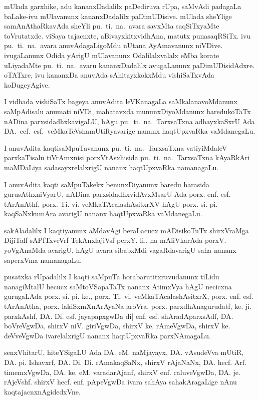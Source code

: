 mUlada garxhike, adu kananxDadalilx paDediruva rUpa, saMvAdi padagaLa baLake-ivu mUlavanunx kananxDadalilx paDimUDisive. mUlada sheYlige samAnAthaRkavAda sheYli pu.~ti.~na.~avara savxMta saqSiTxyaMte toVrutatxde. viSaya tajacnxte, aBivayxkitxvidhAna, matutx punasaqRSiTx. ivu pu.~ti.~na.~avara anuvAdagaLigoMdu nUtana AyAmavanunx niVDive. ivugaLanunx Odida yArigU mUlavanunx Odalilalxvalalx eMba korate uLiyadaMte pu.~ti.~na.~avaru kananxDadalilx avugaLanunx paDimUDisidAdxre. oTATxre, ivu kananxDa anuvAda sAhitayxkokxMdu vishiSaTxvAda koDugeyAgive.

I vidhada vishiSaTx bageya anuvAdita leVKanagaLa saMkalanavoMdanunx saMpAdi\-salu anumati niVDi, mahatavxda mununxDiyoMdanunx baredukoTaTx nADina parxsidadhx\-kavi\-gaLU, hAgu pu.~ti.~na.~TarxsaTxna adhayxkaSxrU Ada DA.~ecf.~esf.~veMkaTeVshamUtiR\-yavarige nananx haqtUpxvaRka vaMdanegaLu.

I anuvAdita kaqtisaMpuTavanunx pu.~ti.~na.~TarxsaTxna vatiyiMdaleV parxkaTisalu tiVrAmxnisi porxVtAsxhisida pu.~ti.~na.~TarxsaTxna kAyaRkAri maMDaLiya sadasayxrelalxrigU nananx haqtUpxvaRka namanagaLu. 

I anuvAdita kaqti saMpuTakekx benunxDiyanunx baredu  harasida gurusAthxniVyarU, nADina parxsidadhxvidAvxMsarU Ada porx. enf. esf. tArAnAthf. porx. Ti. vi. veMkaTAcalashAsitxrXV hAgU porx. si. pi. kaqSaNxkumAra avarigU nananx haqtUpxvaRka vaMdanegaLu.

 sakAladalilx I kaqtiyanunx aMdavAgi beraLacucx mADisikoTuTx shirxVraMga DijiTalf sAPfTxveVrf TekAnxlajiVsf perxY. li., na mAliVkarAda porxV. yoVgAnaMda avarigU, hAgU avara sibabxMdi vagaRdavarigU saha nananx saperxVma namanagaLu.

pusatxka rUpadalilx I kaqti saMpuTa horabarutitxruvudanunx tiLidu nanagiMtalU hecucx saMtoVSapaTaTx nananx AtimxVya hAgU necicxna gurugaLAda porx. si. pi. ke., porx. Ti. vi. veMkaTAcalashAsitxrX, porx. enf. esf. tArAnAtha, porx. lakiSxmXnArAyaNa aroVra, porx. parxdhAnagurudatf, ke. ji. parxkAshf, DA. Di. esf. jayapapxgwDa di| enf. esf. shAradAparxsAdf, DA. boVreVgwDa, shirxV niV. giriVgwDa, shirxV ke. rAmeVgwDa, shirxV ke. deVveVgwDa ivarelalxrigU nananx haqtUpxvaRka parxNAmagaLu. 

senxVhitarU, hiteYSigaLU Ada DA. eM. naMjayayx, DA. vAsudeVva mUtiR, DA. pi. Ishavxrf, DA. Di. Di. rAmakaqSaNx, shirxV rAjaNaNx, DA. hecf. Arf. timemxVgwDa, DA. ke. eM. varadarAjanf, shirxV enf. caluveVgwDa, DA. je. rAjeVshf. shirxV hecf. enf. pApeVgwDa ivara sahAya sahakAragaLige nAnu kaqtajacnxnAgidedxVne.

